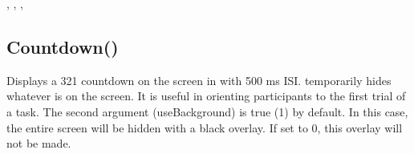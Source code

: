 \documentclass[letterpaper,10pt,english]{sphinxmanual}
\begin{document}
\sphinxAtStartPar
{}

\begin{sphinxVerbatim}[commandchars=\\\{\}]
\PYG{p}{[}\PYG{p}{]}
\end{sphinxVerbatim}

\sphinxAtStartPar
{}

\begin{sphinxVerbatim}[commandchars=\\\{\}]
\PYG{p}{[}\PYG{p}{]}\PYG{p}{[}\PYG{p}{]}
\end{sphinxVerbatim}

\sphinxAtStartPar
{}

\sphinxAtStartPar
{}, , , 

\ignorespaces 

\subsection{Countdown()}
\label{\detokenize{reference/utility:countdown}}\label{\detokenize{reference/utility:index-58}}
\sphinxAtStartPar
{}

\sphinxAtStartPar
Displays a 3\sphinxhyphen{}2\sphinxhyphen{}1 countdown on the screen in with 500 ms ISI.  temporarily hides whatever is on the screen. It is useful in orienting participants to the first trial of a task. The second argument (useBackground) is true (1) by default. In this case, the entire screen will be hidden with a black overlay. If set to 0, this overlay will not be made.

\sphinxAtStartPar
{}
\end{document}
